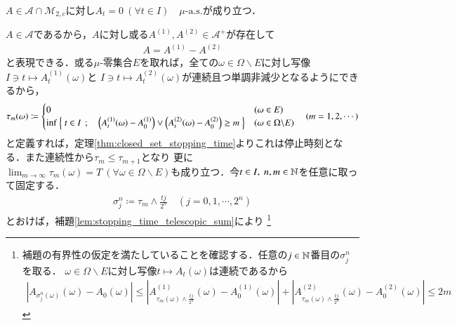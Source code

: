 	\begin{screen}
		\begin{prp}[有界変動な連続二乗可積分マルチンゲールのパスは定数]\mbox{}\\
			$A \in \mathcal{A} \cap \mathcal{M}_{2,c}$に対し$A_t = 0\ (\forall t \in I)\quad \mbox{$\mu$-a.s.}$が成り立つ．
			\label{prp:bounded_continuous_M_2c_path}
		\end{prp}
	\end{screen}
	
	\begin{prf}
		$A \in \mathcal{A}$であるから，$A$に対し或る$A^{(1)},A^{(2)} \in \mathcal{A}^+$が存在して
		\begin{align}
			A = A^{(1)} - A^{(2)}
		\end{align}
		と表現できる．或る$\mu$-零集合$E$を取れば，全ての$\omega \in \Omega \backslash E$に対し写像$I \ni t \longmapsto A_t^{(1)}(\omega)$と
		$I \ni t \longmapsto A_t^{(2)}(\omega)$が連続且つ単調非減少となるようにできるから，
		\begin{align}
			\tau_m(\omega) \coloneqq
			\begin{cases}
				0 & (\omega \in E) \\
				\operatorname*{inf}_{} \left\{\ t \in I\ \, ; \quad \left( A_t^{(1)}(\omega) - A_0^{(1)} \right) \vee \left( A_t^{(2)}(\omega) - A_0^{(2)} \right) \geq m\ \right\} & (\omega \in \Omega \backslash E)
			\end{cases}
			\quad (m=1,2,\cdots)
		\end{align}
		と定義すれば，定理\ref{thm:closed_set_stopping_time}よりこれは停止時刻となる．また連続性から$\tau_m \leq \tau_{m+1}$となり
		更に$\lim_{m \to \infty}\tau_m(\omega) = T\ (\forall \omega \in \Omega \backslash E)も成り立つ．
		$今$t \in I,\ n,m \in \mathbb{N}$を任意に取って固定する．
		\begin{align}
			\sigma_j^n \coloneqq \tau_m \wedge \frac{tj}{2^n} \quad (j = 0,1,\cdots, 2^n)
		\end{align}
		とおけば，補題\ref{lem:stopping_time_telescopic_sum}により
		\footnote{
			補題の有界性の仮定を満たしていることを確認する．任意の$j \in \mathbb{N}$番目の$\sigma_j^n$を取る．
			$\omega \in \Omega \backslash E$に対し写像$t \longmapsto A_t(\omega)$は連続であるから
			\begin{align}
				\left| A_{\sigma_j^n(\omega)}(\omega) - A_0(\omega) \right| 
				\leq \left| A^{(1)}_{\tau_m(\omega)\wedge \frac{tj}{2^n}}(\omega) - A^{(1)}_0(\omega) \right| + \left| A^{(2)}_{\tau_m(\omega)\wedge \frac{tj}{2^n}}(\omega) - A^{(2)}_0(\omega) \right|
				\leq 2m
			\end{align}
}
\end{prf}
